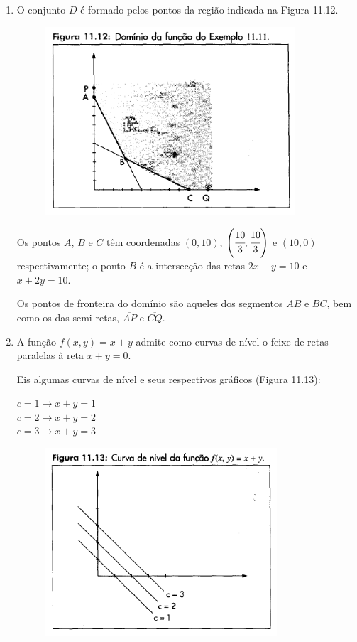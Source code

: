 		\begin{enumerate}[label=\alph*)]

			\item O conjunto $D$ é formado pelos pontos da região indicada na Figura 11.12.

			\begin{figure}[H]
				\includegraphics[height=7cm]{images/morettin_figura-11-12}
			\end{figure}

			Os pontos $A$, $B$ e $C$ têm coordenadas $(0, 10)$, $\left( \cfrac{10}{3}, \cfrac{10}{3} \right)$ e $(10, 0)$ respectivamente; o ponto $B$ é a intersecção das retas $2x + y = 10$ e $x + 2y = 10$.

			Os pontos de fronteira do domínio são aqueles dos segmentos $\overline{AB}$ e $\overline{BC}$, bem como os das semi-retas, $\overline{AP}$ e $\overline{CQ}$.

			\item A função $f(x, y) = x + y$ admite como curvas de nível o feixe de retas paralelas à reta $x + y = 0$.

			Eis algumas curvas de nível e seus respectivos gráficos (Figura 11.13):

			\medskip

			$c = 1 \rightarrow x + y = 1$ \\
			$c = 2 \rightarrow x + y = 2$ \\
			$c = 3 \rightarrow x + y = 3$ \\

			\begin{figure}[H]
				\includegraphics[height=7cm]{images/morettin_figura-11-13}
			\end{figure}


\end{enumerate}
